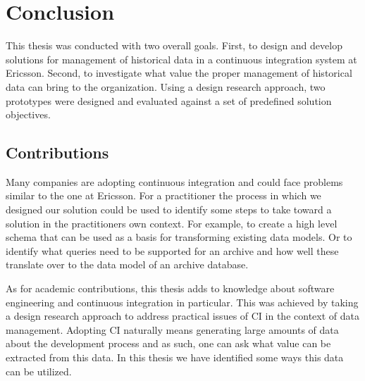 \chapter{Conclusion}
\label{chap:conclusion}
This thesis was conducted with two overall goals. First, to design and develop solutions for management of historical data in a continuous integration system at Ericsson. Second, to investigate what value the proper management of historical data can bring to the organization. Using a design research approach, two prototypes were designed and evaluated against a set of predefined solution objectives.



%
%


\section{Contributions}


Many companies are adopting continuous integration and could face problems similar to the one at Ericsson. For a practitioner the process in which we designed our solution could be used to identify some steps to take toward a solution in the practitioners own context. For example, to create a high level schema that can be used as a basis for transforming existing data models. Or to identify what queries need to be supported for an archive and how well these translate over to the data model of an archive database.

As for academic contributions, this thesis adds to knowledge about software engineering and continuous integration in particular. This was achieved by taking a design research approach to address practical issues of CI in the context of data management. Adopting CI naturally means generating large amounts of data about the development process and as such, one can ask what value can be extracted from this data. In this thesis we have identified some ways this data can be utilized. 

